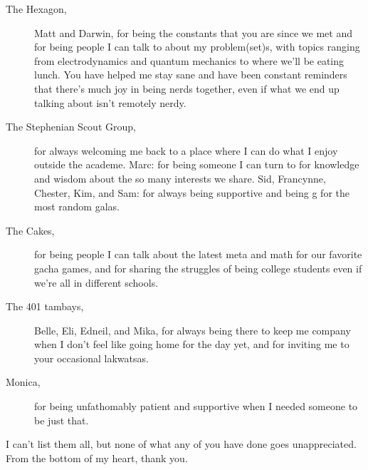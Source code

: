 \begin{description}
    \item[The Hexagon,] Matt and Darwin, for being the constants that you are since we met and for being people I can talk to about my problem(set)s, with topics ranging from electrodynamics and quantum mechanics to where we'll be eating lunch. You have helped me stay sane and have been constant reminders that there's much joy in being nerds together, even if what we end up talking about isn't remotely nerdy.
    \item[The Stephenian Scout Group,] for always welcoming me back to a place where I can do what I enjoy outside the academe. Marc: for being someone I can turn to for knowledge and wisdom about the so many interests we share. Sid, Francynne, Chester, Kim, and Sam: for always being supportive and being g for the most random galas. 
    \item[The Cakes,] for being people I can talk about the latest meta and math for our favorite gacha games, and for sharing the struggles of being college students even if we're all in different schools. 
    \item[The 401 tambays,] Belle, Eli, Edneil, and Mika, for always being there to keep me company when I don't feel like going home for the day yet, and for inviting me to your occasional lakwatsas.
    \item[Monica,] for being unfathomably patient and supportive when I needed someone to be just that.
\end{description}

I can't list them all, but none of what any of you have done goes unappreciated. From the bottom of my heart, thank you.
